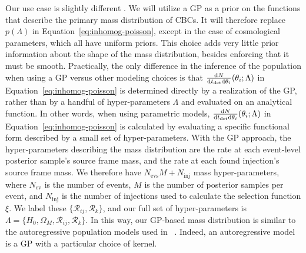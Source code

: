 \documentclass[]{aastex631}
\begin{document}
Our use case is slightly different .
We will utilize a \ac{GP} as a prior on the functions that describe the primary mass distribution of \acp{CBC}.
It will therefore replace $p(\Lambda)$ in Equation~\ref{eq:inhomog-poisson}, except in the case of cosmological parameters, which all have uniform priors.
This choice adds very little prior information about the shape of the mass distribution, besides enforcing that it must be smooth.
Practically, the only difference in the inference of the population when using a GP versus other modeling choices is that $\frac{\text{d} N}{\text{d} t_{\det} \text{d} \theta_i} (\theta_i;\Lambda)$ in Equation~\ref{eq:inhomog-poisson} is determined directly by a realization of the \ac{GP}, rather than by a handful of hyper-parameters $\Lambda$ and evaluated on an analytical function. %
In other words, when using parametric models, $\frac{\text{d} N}{\text{d} t_{\det} \text{d} \theta_i} (\theta_i;\Lambda)$ in Equation~\ref{eq:inhomog-poisson} is calculated by evaluating a specific functional form described by a small set of hyper-parameters. 
With the GP approach, the hyper-parameters describing the mass distribution are the rate at each event-level posterior sample's source frame mass, and the rate at each found injection's source frame mass.
We therefore have $N_{\text{evs}}M + N_{\text{inj}}$ mass hyper-parameters, where $N_{\text{ev}}$ is the number of events, $M$ is the number of posterior samples per event, and $N_{\text{inj}}$ is the number of injections used to calculate the selection function $\xi$.
We label these $\{\mathcal{R}_{ij},\mathcal{R}_k\}$, and our full set of hyper-parameters is $\Lambda=\{H_0, \Omega_M, \mathcal{R}_{ij},\mathcal{R}_k\}$. 
In this way, our GP-based mass distribution is similar to the autoregressive population models used in ~\citet{callister_parameter-free_2023}.
Indeed, an autoregressive model is a \ac{GP} with a particular choice of kernel.
\end{document}
